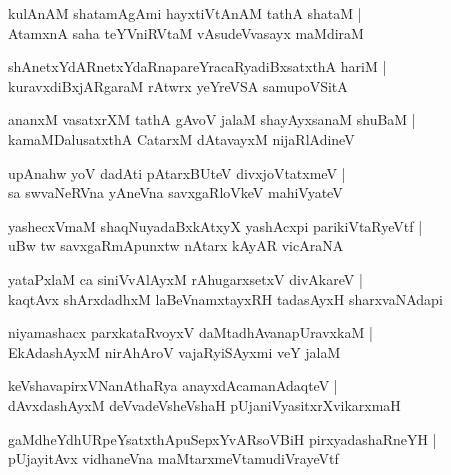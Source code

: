 \documentclass[twoside,12pt,openright]{book}
\newcounter{shloka}[chapter]
\begin{document}
\begin{shloka}%
kulAnAM shatamAgAmi hayxtiVtAnAM tathA shataM |\\
AtamxnA saha teYVniRVtaM vAsudeVvasayx maMdiraM
\end{shloka}

\begin{shloka}%
shAnetxYdARnetxYdaRnapareYracaRyadiBxsatxthA hariM |\\
kuravxdiBxjARgaraM rAtwrx yeYreVSA samupoVSitA
\end{shloka}

\begin{shloka}%
ananxM vasatxrXM tathA gAvoV jalaM shayAyxsanaM shuBaM |\\
kamaMDalusatxthA CatarxM dAtavayxM nijaRlAdineV 
\end{shloka}

\begin{shloka}%
upAnahw yoV dadAti pAtarxBUteV divxjoVtatxmeV |\\
sa swvaNeRVna yAneVna savxgaRloVkeV mahiVyateV
\end{shloka}

\begin{shloka}%
yashecxVmaM shaqNuyadaBxkAtxyX yashAcxpi parikiVtaRyeVtf |\\
uBw tw savxgaRmApunxtw nAtarx kAyAR vicAraNA
\end{shloka}

\begin{shloka}%
yataPxlaM ca siniVvAlAyxM rAhugarxsetxV divAkareV |\\
kaqtAvx shArxdadhxM laBeVnamxtayxRH tadasAyxH sharxvaNAdapi
\end{shloka}

\begin{shloka}%
niyamashacx parxkataRvoyxV daMtadhAvanapUravxkaM |\\
EkAdashAyxM nirAhAroV vajaRyiSAyxmi veY jalaM 
\end{shloka}

\begin{shloka}%
keVshavapirxVNanAthaRya anayxdAcamanAdaqteV |\\
dAvxdashAyxM deVvadeVsheVshaH pUjaniVyasitxrXvikarxmaH
\end{shloka}

\begin{shloka}%
gaMdheYdhURpeYsatxthApuSepxYvARsoVBiH pirxyadashaRneYH |\\
pUjayitAvx vidhaneVna maMtarxmeVtamudiVrayeVtf
\end{shloka}
\end{document}
